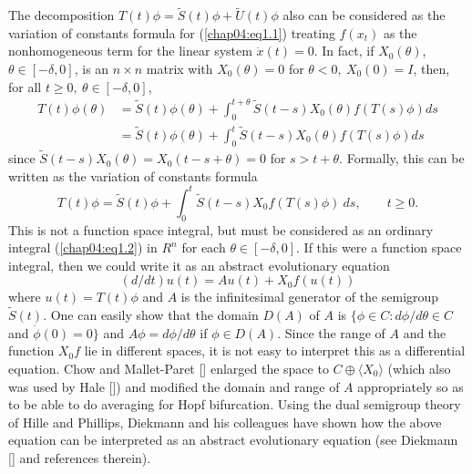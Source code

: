 \documentclass{surv-l}
\theoremstyle{plain}
\theoremstyle{definition}
\numberwithin{equation}{section}
\numberwithin{figure}{chapter}
\begin{document}
The decomposition $ T(t)\phi=\tilde{S}(t)\phi+\tilde{U}(t)\phi$ also can be considered as the variation of constants formula for (\ref{chap04:eq1.1}) treating $f(x_{t})$ as the nonhomogeneous term for the linear system $\dot{x}(t)=0$. In fact, if $X_{0}(\theta)$, $\theta\in[-\delta, 0]$, is an $n\times n$ matrix with $X_{0}(\theta)=0$ for $\theta<0,\ X_{0}(0)=I$, then, for all $t\geq 0,\ \theta\in[-\delta, 0]$,
\begin{equation}\label{chap04:eq1.2}
\begin{split}
T(t)\phi(\theta)&=\tilde{S}(t)\phi(\theta)+\int_{0}^{t+\theta}\tilde{S}(t-s)X_{0}(\theta)f(T(s)\phi)ds\\
&=\tilde{S}(t)\phi(\theta)+\int_{0}^{t}\tilde{S}(t-s)X_{0}(\theta)f(T(s)\phi)ds
\end{split}
\end{equation}
since $\tilde{S}(t-s)X_{0}(\theta)=X_{0}(t-s+\theta)=0$ for $ s>t+\theta$. Formally, this can be written as the variation of constants formula
\begin{equation*}
T(t)\phi=\tilde{S}(t)\phi+\int_{0}^{t}\tilde{S}(t-s)X_{0}f(T(s)\phi)\ ds,\qquad t\geq 0.
\end{equation*}
This is not a function space integral, but must be considered as an ordinary integral (\ref{chap04:eq1.2}) in $R^{n}$ for each $\theta\in[-\delta, 0]$. If this were a function space integral, then we could write it as an abstract evolutionary equation
\begin{equation*}
(d/dt)u(t)=Au(t)+X_{0}f(u(t))
\end{equation*}
where $ u(t)=T(t)\phi$ and $A$ is the infinitesimal generator of the semigroup $\tilde{S}(t)$. One can easily show that the domain $D(A)$ of $A$ is $\{\phi\in C\!:d\phi/d\theta\in C$ and $\dot{\phi}(0)=0\}$ and $ A\phi =d\phi/d\theta$ if $\phi \in D(A)$. Since the range of $A$ and the function $X_{0}f$ lie in different spaces, it is not easy to interpret this as a differential equation. Chow and Mallet-Paret [\citeyear{1977cm}] enlarged the space to $ C\oplus\langle X_{0}\rangle$ (which also was used by Hale [\citeyear{1977h}]) and modified the domain and range of $A$ appropriately so as to be able to do averaging for Hopf bifurcation. Using the dual semigroup theory of Hille and Phillips, Diekmann and his colleagues have shown how the above equation can be interpreted as an abstract evolutionary equation (see Diekmann [\citeyear{1987d}] and references therein).
\end{document}
